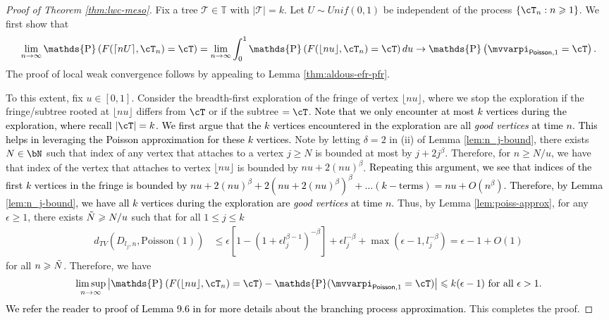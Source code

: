 \documentclass[letterpaper,11pt,reqno]{amsart}
\theoremstyle{definition}
\renewcommand{\leq}{\leqslant}
\renewcommand{\geq}{\geqslant}
\newcommand{\abs}[1]{\left\vert#1\right\vert}
\newcommand{\set}[1]{\left\{#1\right\}}
\DeclareMathOperator{\pr}{\mathds{P}}
\newcommand{\bbT}{\mathbb{T}}
\newcommand{\TT}{\mathcal{T}}
\newcommand{\Poi}{{\sf Poisson} }
\newcommand{\fpm}{\mvvarpi}
\begin{document}
\begin{proof}[Proof of Theorem \ref{thm:lwc-meso}]
    Fix a tree $\TT \in \bbT$ with $\abs{\TT} = k$. Let $U\sim Unif(0,1)$ be independent of the process $\set{\cT_n:n\geq 1}$. We first show that \begin{equation*}
    \lim_{n\to \infty}\pr\left(F( \lceil n U\rceil, \cT_n) =  \cT\right) = \lim_{n\to \infty} \int_{0}^1 \pr\left(F( \lfloor n u\rfloor, \cT_n) =  \cT\right) du \to \pr\left(\fpm_{\Poi, 1} = \cT \right).
\end{equation*} The proof of local weak convergence follows by appealing to Lemma \ref{thm:aldous-efr-pfr}.

To this extent, fix $u \in [0,1]$. Consider the breadth-first exploration of the fringe of vertex $\lfloor n u\rfloor$, where we stop the exploration if the fringe/subtree rooted at $\lfloor n u\rfloor$ differs from $\cT$ or if the subtree $= \cT$. \textcolor{black}{Note that we only encounter at most $k$ vertices during the exploration, where recall $|\cT|=k$. 
}%
\textcolor{black}{We first argue that the $k$ vertices encountered in the exploration are all \emph{ good vertices} at time $n$. This helps in leveraging the Poisson approximation for these $k$ vertices.} Note by letting $\delta = 2$ in (ii) of Lemma \ref{lem:n_j-bound}, there exists $N \in \bN$ such that index of any vertex that attaches to a vertex $j \geq  N$ is bounded at most by $j+2j^\beta$. Therefore, for $n \geq N/u$, we have that index of the vertex that attaches to vertex $\lfloor nu \rfloor$ is bounded by $nu + 2(nu)^\beta$. \textcolor{black}{Repeating this argument, we see that indices of the first $k$ vertices in the fringe is bounded by $nu + 2(nu)^\beta + 2(nu+2(nu)^\beta)^\beta + \dots (k-\text{terms}) = nu + O(n^\beta)$. Therefore, by Lemma \ref{lem:n_j-bound}, we have all $k$ vertices during the exploration are \emph{good vertices} at time $n$.} Thus, by Lemma \ref{lem:poiss-approx}, for any $\epsilon \geq 1$, there exists $\Tilde{N} \geq N/u$ such that for all $1\leq j\leq k$ \begin{align*}
    d_{TV}(D_{l_j,n},\text{Poisson}(1)) &\leq \epsilon \left[1-(1+\epsilon l_j^{\beta-1})^{-\beta}\right] + \epsilon l_j^{-\beta}+ \max(\epsilon-1,l_j^{-\beta}) = \epsilon - 1+ O(1)
\end{align*}for all  $n\geq \Tilde{N}$. Therefore, we have \begin{align*}
    \limsup_{n\to \infty}\left|\pr\left(F( \lfloor n u\rfloor, \cT_n) =  \cT\right) - \pr(\fpm_{\Poi, 1} = \cT)\right| \leq k(\epsilon - 1) \text{ for all }\epsilon >1.
\end{align*} \textcolor{black}{We refer the reader to proof of Lemma 9.6 in \cite{bollobas-irg} for more details about the branching process approximation.} This completes the proof.
\end{proof}
\end{document}
